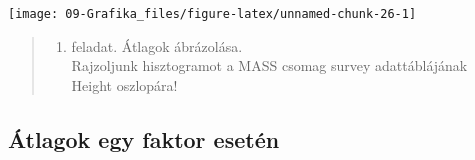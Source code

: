 \documentclass[
]{book}
\providecommand{\tightlist}{%
  \setlength{\itemsep}{0pt}\setlength{\parskip}{0pt}}
\begin{document}
\begin{center}\texttt{[image: 09-Grafika\_files/figure-latex/unnamed-chunk-26-1]} \end{center}

\begin{quote}
\begin{enumerate}
\def\labelenumi{\arabic{enumi}.}
\setcounter{enumi}{3}
\tightlist
\item
  feladat. Átlagok ábrázolása.\\
  Rajzoljunk hisztogramot a MASS csomag survey adattáblájának Height oszlopára!
\end{enumerate}
\end{quote}

\hypertarget{uxe1tlagok-egy-faktor-esetuxe9n}{%
\subsection{Átlagok egy faktor esetén}\label{uxe1tlagok-egy-faktor-esetuxe9n}}
\end{document}
